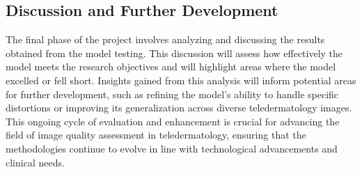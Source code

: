 \subsection{Discussion and Further Development}
\label{sub:DiscussionDevelopment}
The final phase of the project involves analyzing and discussing the results obtained from the model testing. This discussion will assess how effectively the model meets the research objectives and will highlight areas where the model excelled or fell short. Insights gained from this analysis will inform potential areas for further development, such as refining the model's ability to handle specific distortions or improving its generalization across diverse teledermatology images. This ongoing cycle of evaluation and enhancement is crucial for advancing the field of image quality assessment in teledermatology, ensuring that the methodologies continue to evolve in line with technological advancements and clinical needs. \par




